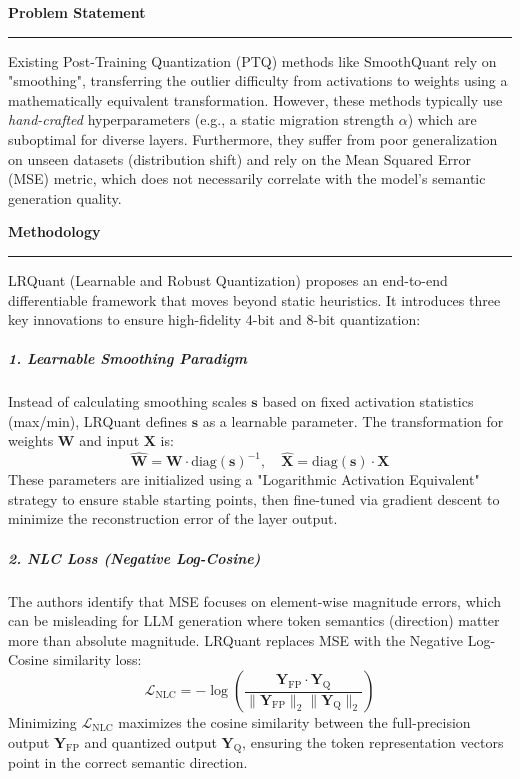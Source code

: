 \documentclass[11pt,a4paper]{article}
\newcommand{\problemp}[1]{%
  \par\medskip
  {\noindent\bfseries\normalsize\color{signcol}#1\par}%
  \vspace{0.4ex}%
  {\noindent\color{softgray}\rule{\linewidth}{0.6pt}\par}%
  \vspace{0.8ex}%
}
\theoremstyle{definition}
\begin{document}
\problemp{Problem Statement}
Existing Post-Training Quantization (PTQ) methods like SmoothQuant rely on "smoothing", transferring the outlier difficulty from activations to weights using a mathematically equivalent transformation. However, these methods typically use \textit{hand-crafted} hyperparameters (e.g., a static migration strength $\alpha$) which are suboptimal for diverse layers. Furthermore, they suffer from poor generalization on unseen datasets (distribution shift) and rely on the Mean Squared Error (MSE) metric, which does not necessarily correlate with the model's semantic generation quality.

\vspace{1cm}
\problemp{Methodology}
LRQuant (Learnable and Robust Quantization) proposes an end-to-end differentiable framework that moves beyond static heuristics. It introduces three key innovations to ensure high-fidelity 4-bit and 8-bit quantization:

\subparagraph{1. Learnable Smoothing Paradigm}
Instead of calculating smoothing scales $\mathbf{s}$ based on fixed activation statistics (max/min), LRQuant defines $\mathbf{s}$ as a learnable parameter. The transformation for weights $\bm{W}$ and input $\bm{X}$ is:
\begin{equation}
    \hat{\bm{W}} = \bm{W} \cdot \text{diag}(\mathbf{s})^{-1}, \quad \hat{\bm{X}} = \text{diag}(\mathbf{s}) \cdot \bm{X}
\end{equation}
These parameters are initialized using a "Logarithmic Activation Equivalent" strategy to ensure stable starting points, then fine-tuned via gradient descent to minimize the reconstruction error of the layer output.

\subparagraph{2. NLC Loss (Negative Log-Cosine)}
The authors identify that MSE focuses on element-wise magnitude errors, which can be misleading for LLM generation where token semantics (direction) matter more than absolute magnitude. LRQuant replaces MSE with the Negative Log-Cosine similarity loss:
\begin{equation}
    \mathcal{L}_{\text{NLC}} = - \log \left( \frac{\bm{Y}_{\text{FP}} \cdot \bm{Y}_{\text{Q}}}{\| \bm{Y}_{\text{FP}} \|_2 \| \bm{Y}_{\text{Q}} \|_2} \right)
\end{equation}
Minimizing $\mathcal{L}_{\text{NLC}}$ maximizes the cosine similarity between the full-precision output $\bm{Y}_{\text{FP}}$ and quantized output $\bm{Y}_{\text{Q}}$, ensuring the token representation vectors point in the correct semantic direction.
\end{document}
